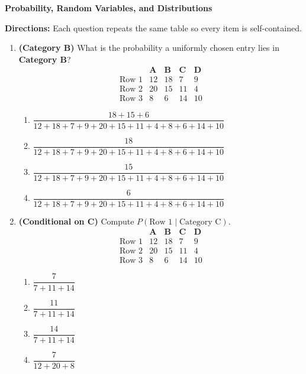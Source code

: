 \documentclass[12pt]{article}
\begin{document}
{\LARGE \textbf{Probability, Random Variables, and Distributions}}

\bigskip
\noindent\textbf{Directions:} Each question repeats the same table so every item is self-contained.

\begin{enumerate}[label=\textbf{S\arabic*.}]

\item \textbf{(Category B)} What is the probability a uniformly chosen entry lies in \textbf{Category B}?
\[
\begin{array}{c|cccc}
  & \mathbf{A} & \mathbf{B} & \mathbf{C} & \mathbf{D} \\\hline
  \text{Row 1} & 12 & 18 & 7  & 9  \\
  \text{Row 2} & 20 & 15 & 11 & 4  \\
  \text{Row 3} & 8  & 6  & 14 & 10
\end{array}
\]
\begin{enumerate}[label=(\Alph*)]
\item $\dfrac{18+15+6}{12+18+7+9+20+15+11+4+8+6+14+10}$
\item $\dfrac{18}{12+18+7+9+20+15+11+4+8+6+14+10}$
\item $\dfrac{15}{12+18+7+9+20+15+11+4+8+6+14+10}$
\item $\dfrac{6}{12+18+7+9+20+15+11+4+8+6+14+10}$
\end{enumerate}

\item \textbf{(Conditional on C)} Compute $P(\text{Row 1}\mid \text{Category C})$.
\[
\begin{array}{c|cccc}
  & \mathbf{A} & \mathbf{B} & \mathbf{C} & \mathbf{D} \\\hline
  \text{Row 1} & 12 & 18 & 7  & 9  \\
  \text{Row 2} & 20 & 15 & 11 & 4  \\
  \text{Row 3} & 8  & 6  & 14 & 10
\end{array}
\]
\begin{enumerate}[label=(\Alph*)]
\item $\dfrac{7}{7+11+14}$
\item $\dfrac{11}{7+11+14}$
\item $\dfrac{14}{7+11+14}$
\item $\dfrac{7}{12+20+8}$
\end{enumerate}


\end{enumerate}
\end{document}
